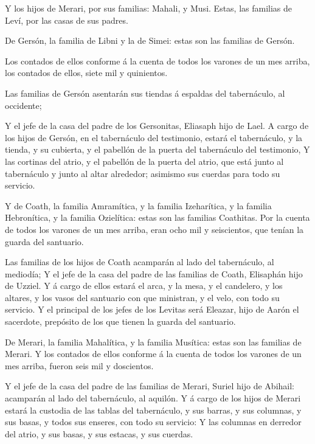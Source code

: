  Y los hijos de Merari, por sus familias: Mahali, y Musi.
Estas, las familias de Leví, por las casas de sus padres.

 De Gersón, la familia de Libni y la de Simei: estas son
las familias de Gersón.

 Los contados de ellos conforme á la cuenta de todos los
varones de un mes arriba, los contados de ellos, siete mil y quinientos.

 Las familias de Gersón asentarán sus tiendas á espaldas
del tabernáculo, al occidente;

 Y el jefe de la casa del padre de los Gersonitas, Eliasaph
hijo de Lael.  A cargo de los hijos de Gersón, en el
tabernáculo del testimonio, estará el tabernáculo, y la tienda, y su
cubierta, y el pabellón de la puerta del tabernáculo del testimonio,
 Y las cortinas del atrio, y el pabellón de la puerta del
atrio, que está junto al tabernáculo y junto al altar alrededor;
asimismo sus cuerdas para todo su servicio.

 Y de Coath, la familia Amramítica, y la familia
Izeharítica, y la familia Hebronítica, y la familia Ozielítica: estas
son las familias Coathitas.  Por la cuenta de todos los
varones de un mes arriba, eran ocho mil y seiscientos, que tenían la
guarda del santuario.

 Las familias de los hijos de Coath acamparán al lado del
tabernáculo, al mediodía;  Y el jefe de la casa del padre
de las familias de Coath, Elisaphán hijo de Uzziel.  Y á
cargo de ellos estará el arca, y la mesa, y el candelero, y los altares,
y los vasos del santuario con que ministran, y el velo, con todo su
servicio.  Y el principal de los jefes de los Levitas será
Eleazar, hijo de Aarón el sacerdote, prepósito de los que tienen la
guarda del santuario.

 De Merari, la familia Mahalítica, y la familia Musítica:
estas son las familias de Merari.  Y los contados de ellos
conforme á la cuenta de todos los varones de un mes arriba, fueron seis
mil y doscientos.

 Y el jefe de la casa del padre de las familias de Merari,
Suriel hijo de Abihail: acamparán al lado del tabernáculo, al aquilón.
 Y á cargo de los hijos de Merari estará la custodia de las
tablas del tabernáculo, y sus barras, y sus columnas, y sus basas, y
todos sus enseres, con todo su servicio:  Y las columnas en
derredor del atrio, y sus basas, y sus estacas, y sus cuerdas.

